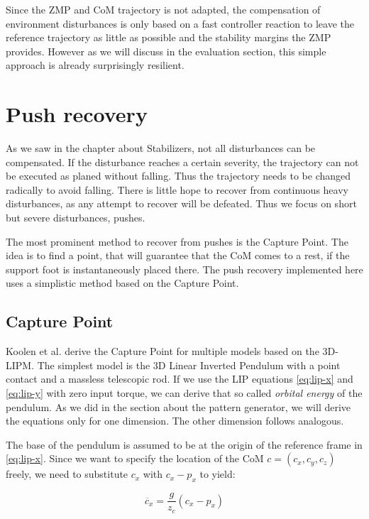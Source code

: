 \documentclass[english,ngerman]{KITreprt}
\begin{document}
Since the ZMP and CoM trajectory is not adapted, the compensation of
environment disturbances is only based on a fast controller reaction to
leave the reference trajectory as little as possible and the stability
margins the ZMP provides. However as we will discuss in the evaluation
section, this simple approach is already surprisingly resilient.

\chapter{Push recovery}\label{push-recovery}

As we saw in the chapter about Stabilizers, not all disturbances can be
compensated. If the disturbance reaches a certain severity, the
trajectory can not be executed as planed without falling. Thus the
trajectory needs to be changed radically to avoid falling. There is
little hope to recover from continuous heavy disturbances, as any
attempt to recover will be defeated. Thus we focus on short but severe
disturbances, pushes.

The most prominent method to recover from pushes is the Capture Point.
The idea is to find a point, that will guarantee that the CoM comes to a
rest, if the support foot is instantaneously placed there. The push
recovery implemented here uses a simplistic method based on the Capture
Point.

\section{Capture Point}\label{capture-point}

Koolen et al. \cite{koolen2012capturability} derive the Capture Point
for multiple models based on the 3D-LIPM. The simplest model is the 3D
Linear Inverted Pendulum with a point contact and a massless telescopic
rod. If we use the LIP equations \ref{eq:lip-x} and \ref{eq:lip-y} with
zero input torque, we can derive that so called \emph{orbital energy} of
the pendulum. As we did in the section about the pattern generator, we
will derive the equations only for one dimension. The other dimension
follows analogous.

The base of the pendulum is assumed to be at the origin of the reference
frame in \ref{eq:lip-x}. Since we want to specify the location of the
CoM $c = (c_x, c_y, c_z)$ freely, we need to substitute $c_x$ with
$c_x - p_x$ to yield:

\begin{equation} \label{eq:lip-x-general}
\ddot{c_x} = \frac{g}{z_c} (c_x - p_x)
\end{equation}
\end{document}
